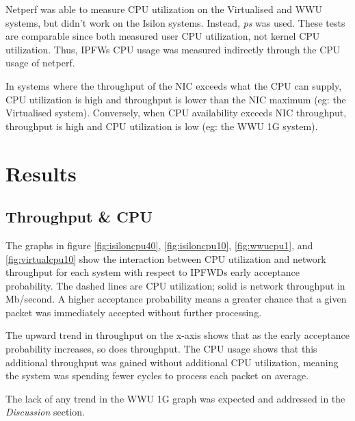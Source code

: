 \documentclass[journal]{IEEEtran}
\begin{document}
    Netperf was able to measure CPU utilization on the Virtualised and WWU
    systems, but didn't work on the Isilon systems. Instead, \textit{ps} was
    used. These tests are comparable since both measured user CPU utilization,
    not kernel CPU utilization. Thus, IPFWs CPU usage was measured indirectly
    through the CPU usage of netperf.

    In systems where the throughput of the NIC exceeds what the CPU can supply,
    CPU utilization is high and throughput is lower than the NIC maximum (eg:
    the Virtualised system). Conversely, when CPU availability exceeds NIC
    throughput, throughput is high and CPU utilization is low (eg: the WWU 1G
    system).


\section{Results}
  
  \subsection{Throughput \& CPU}

    The graphs in figure \ref{fig:isiloncpu40}, \ref{fig:isiloncpu10}, \ref{fig:wwucpu1}, and \ref{fig:virtualcpu10} show the interaction between CPU utilization and network
    throughput for each system with respect to IPFWDs early acceptance
    probability. The dashed lines are CPU utilization; solid is network
    throughput in Mb/second. A higher acceptance probability means a greater
    chance that a given packet was immediately accepted without further
    processing.

    The upward trend in throughput on the x-axis shows that as the early
    acceptance probability increases, so does throughput. The CPU usage shows
    that this additional throughput was gained without additional CPU
    utilization, meaning the system was spending fewer cycles to process each
    packet on average.

    The lack of any trend in the WWU 1G graph was expected and addressed in the
    \textit{Discussion} section.
    
\end{document}
